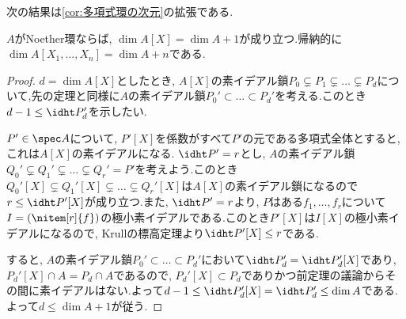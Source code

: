 次の結果は\ref{cor:多項式環の次元}の拡張である.

\begin{cor}
	$A$がNoether環ならば, $\dim A[X]=\dim A+1$が成り立つ.帰納的に$\dim A[X_1,\dots,X_n]=\dim A+n$である.
\end{cor}

\begin{proof}
	$d=\dim A[X]$としたとき, $A[X]$の素イデアル鎖$P_0\subsetneq P_1\subsetneq\dots\subsetneq P_d$について,先の定理と同様に$A$の素イデアル鎖$P_0'\subset\dots\subset P_d'$を考える.このとき$d-1\leq\idht P_d'$を示したい.
	
	$P'\in\spec A$について, $P'[X]$を係数がすべて$P'$の元である多項式全体とすると,これは$A[X]$の素イデアルになる. $\idht P'=r$とし, $A$の素イデアル鎖$Q_0'\subsetneq Q_1'\subsetneq\dots\subsetneq Q_r'=P'$を考えよう.このとき$Q_0'[X]\subsetneq Q_1'[X]\subsetneq\dots\subsetneq Q_r'[X]$は$A[X]$の素イデアル鎖になるので$r\leq\idht P'[X]$が成り立つ.また, $\idht P'=r$より, $P$はある$f_1,\dots,f_r$について$I=(\nitem[r]{f})$の極小素イデアルである.このとき$P'[X]$は$I[X]$の極小素イデアルになるので, Krullの標高定理より$\idht P'[X]\leq r$である.
	
	すると, $A$の素イデアル鎖$P_0'\subset\dots\subset P_d'$において$\idht P_d'=\idht P_d'[X]$であり, $P_d'[X]\cap A=P_d\cap A$であるので, $P_d'[X]\subset P_d$でありかつ前定理の議論からその間に素イデアルはない.よって$d-1\leq\idht P_d'[X]=\idht P_d'\leq\dim A$である.よって$d\leq\dim A+1$が従う.
\end{proof}
